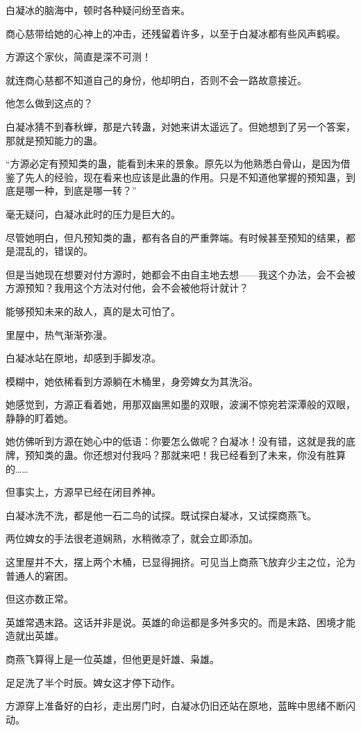 \begin{this_body}
白凝冰的脑海中，顿时各种疑问纷至沓来。

商心慈带给她的心神上的冲击，还残留着许多，以至于白凝冰都有些风声鹤唳。

方源这个家伙，简直是深不可测！

就连商心慈都不知道自己的身份，他却明白，否则不会一路故意接近。

他怎么做到这点的？

白凝冰猜不到春秋蝉，那是六转蛊，对她来讲太遥远了。但她想到了另一个答案，那就是预知能力的蛊。

“方源必定有预知类的蛊，能看到未来的景象。原先以为他熟悉白骨山，是因为借鉴了先人的经验，现在看来也应该是此蛊的作用。只是不知道他掌握的预知蛊，到底是哪一种，到底是哪一转？”

毫无疑问，白凝冰此时的压力是巨大的。

尽管她明白，但凡预知类的蛊，都有各自的严重弊端。有时候甚至预知的结果，都是混乱的，错误的。

但是当她现在想要对付方源时，她都会不由自主地去想——我这个办法，会不会被方源预知？我用这个方法对付他，会不会被他将计就计？

能够预知未来的敌人，真的是太可怕了。

里屋中，热气渐渐弥漫。

白凝冰站在原地，却感到手脚发凉。

模糊中，她依稀看到方源躺在木桶里，身旁婢女为其洗浴。

她感觉到，方源正看着她，用那双幽黑如墨的双眼，波澜不惊宛若深潭般的双眼，静静的盯着她。

她仿佛听到方源在她心中的低语：你要怎么做呢？白凝冰！没有错，这就是我的底牌，预知类的蛊。你还想对付我吗？那就来吧！我已经看到了未来，你没有胜算的……

但事实上，方源早已经在闭目养神。

白凝冰洗不洗，都是他一石二鸟的试探。既试探白凝冰，又试探商燕飞。

两位婢女的手法很老道娴熟，水稍微凉了，就会立即添加。

这里屋并不大，摆上两个木桶，已显得拥挤。可见当上商燕飞放弃少主之位，沦为普通人的窘困。

但这亦数正常。

英雄常遇末路。这话并非是说。英雄的命运都是多舛多灾的。而是末路、困境才能造就出英雄。

商燕飞算得上是一位英雄，但他更是奸雄、枭雄。

足足洗了半个时辰。婢女这才停下动作。

方源穿上准备好的白衫，走出房门时，白凝冰仍旧还站在原地，蓝眸中思绪不断闪动。


\end{this_body}
